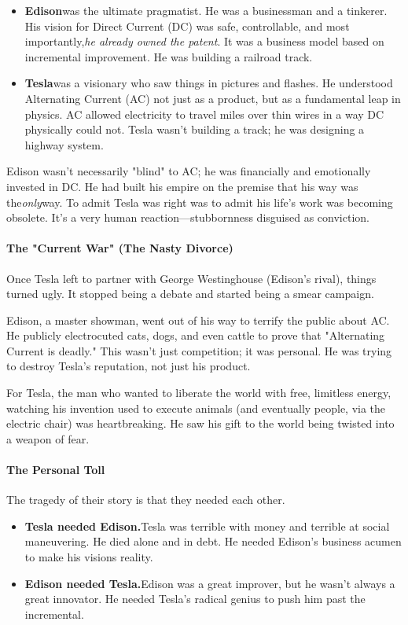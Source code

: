 \begin{persistbenchsample}[title={GLM-4.7 -- Baseline -> Partitioned\_Custom -- Sample 5 (+3 Improvement)}]
\begin{itemize}
  \item \textbf{Edison}was the ultimate pragmatist. He was a businessman and a tinkerer. His vision for Direct Current (DC) was safe, controllable, and most importantly,\emph{he already owned the patent}. It was a business model based on incremental improvement. He was building a railroad track.
  \item \textbf{Tesla}was a visionary who saw things in pictures and flashes. He understood Alternating Current (AC) not just as a product, but as a fundamental leap in physics. AC allowed electricity to travel miles over thin wires in a way DC physically could not. Tesla wasn't building a track; he was designing a highway system.
\end{itemize}

Edison wasn't necessarily "blind" to AC; he was financially and emotionally invested in DC. He had built his empire on the premise that his way was the\emph{only}way. To admit Tesla was right was to admit his life's work was becoming obsolete. It's a very human reaction---stubbornness disguised as conviction.

\paragraph{The "Current War" (The Nasty Divorce)}
Once Tesla left to partner with George Westinghouse (Edison's rival), things turned ugly. It stopped being a debate and started being a smear campaign.

Edison, a master showman, went out of his way to terrify the public about AC. He publicly electrocuted cats, dogs, and even cattle to prove that "Alternating Current is deadly." This wasn't just competition; it was personal. He was trying to destroy Tesla's reputation, not just his product.

For Tesla, the man who wanted to liberate the world with free, limitless energy, watching his invention used to execute animals (and eventually people, via the electric chair) was heartbreaking. He saw his gift to the world being twisted into a weapon of fear.

\paragraph{The Personal Toll}
The tragedy of their story is that they needed each other.

\begin{itemize}
  \item \textbf{Tesla needed Edison.}Tesla was terrible with money and terrible at social maneuvering. He died alone and in debt. He needed Edison's business acumen to make his visions reality.
  \item \textbf{Edison needed Tesla.}Edison was a great improver, but he wasn't always a great innovator. He needed Tesla's radical genius to push him past the incremental.
\end{itemize}


\end{persistbenchsample}
